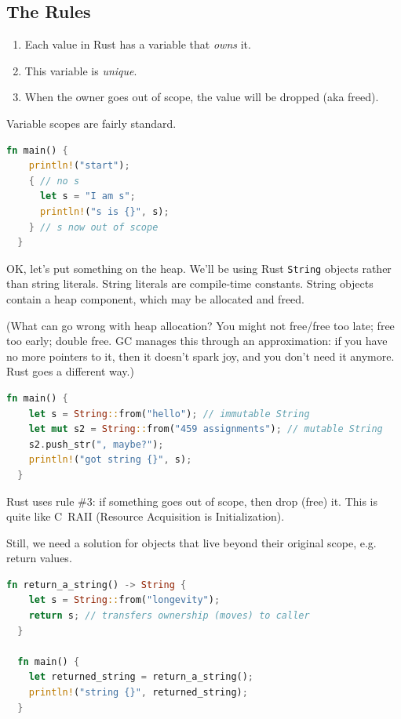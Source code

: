 \documentclass[a4paper]{report}
\newcommand{\CPP}{C\nolinebreak\hspace{-.05em}\raisebox{.4ex}{\tiny\bf +}\nolinebreak\hspace{-.10em}\raisebox{.4ex}{\tiny\bf +}}
\def\CPP{{C\nolinebreak[4]\hspace{-.05em}\raisebox{.4ex}{\tiny\bf ++}}}
\begin{document}
\subsection*{The Rules}
\begin{enumerate}[noitemsep]
\item Each value in Rust has a variable that \emph{owns} it.
\item This variable is \emph{unique}.
\item When the owner goes out of scope, the value will be dropped (aka freed).
\end{enumerate}

Variable scopes are fairly standard.
\begin{lstlisting}[language=Rust]
  fn main() {
    println!("start");
    { // no s
      let s = "I am s";
      println!("s is {}", s);
    } // s now out of scope
  }
\end{lstlisting}

OK, let's put something on the heap. We'll be using Rust {\tt String} objects rather than
string literals. String literals are compile-time constants. String objects contain a heap component,
which may be allocated and freed.

(What can go wrong with heap allocation? You might not free/free too late;
free too early; double free. GC manages this through an approximation: if you have no more pointers to it,
then it doesn't spark joy, and you don't need it anymore. Rust goes a different way.)
\begin{lstlisting}[language=Rust]
  fn main() {
    let s = String::from("hello"); // immutable String
    let mut s2 = String::from("459 assignments"); // mutable String
    s2.push_str(", maybe?");
    println!("got string {}", s);
  }
\end{lstlisting}

Rust uses rule \#3: if something goes out of scope, then drop (free) it.
This is quite like \CPP~RAII (Resource Acquisition is Initialization).

Still, we need a solution for objects that live beyond their original scope, e.g.
return values.
\begin{lstlisting}[language=Rust]
  fn return_a_string() -> String {
    let s = String::from("longevity");
    return s; // transfers ownership (moves) to caller
  }

  fn main() {
    let returned_string = return_a_string();
    println!("string {}", returned_string);
  }
\end{lstlisting}
\end{document}
